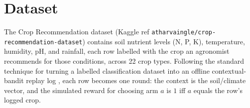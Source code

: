\section{Dataset}
The Crop Recommendation dataset (Kaggle ref
\texttt{atharvaingle/crop-recommendation-dataset}) contains soil nutrient
levels (N, P, K), temperature, humidity, pH, and rainfall, each row labelled
with the crop an agronomist recommends for those conditions, across 22
crop types. Following the standard technique for turning a labelled
classification dataset into an offline contextual-bandit replay log
\cite{li2011unbiased}, each row becomes one round: the context is the
soil/climate vector, and the simulated reward for choosing arm $a$ is $1$
iff $a$ equals the row's logged crop.
